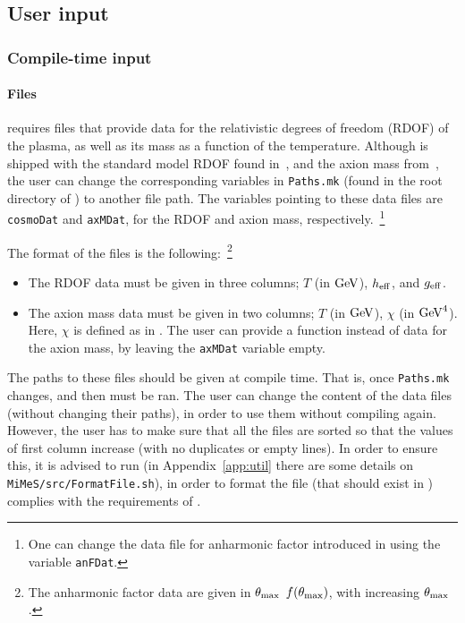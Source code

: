 \documentclass[11pt,a4paper]{article}
\begin{document}
\subsection{User input}\label{sec:input}
%
\subsubsection{Compile-time input}\label{sec:compile_time_input} 
%
\paragraph{Files} \mimes requires files that provide data for the relativistic degrees of freedom (RDOF) of the plasma, as well as its mass as a function of the temperature. Although \mimes is shipped with the standard model RDOF found in~\cite{Saikawa:2020swg}, and the axion mass from~\cite{Borsanyi:2016ksw}, the user can change the corresponding variables in {\tt Paths.mk} (found in the root directory of \mimes) to another file path. The variables pointing to these data files are {\tt cosmoDat} and {\tt axMDat}, for the RDOF and axion mass, respectively.~\footnote{One can change the data file for anharmonic factor introduced in  using the variable {\tt anFDat}.}

The format of the files is the following:~\footnote{The anharmonic factor data are given in $\theta_{\rm max}{}$ $f(\theta_{\rm max}{})$, with increasing $\theta_{\rm max}{}$.} 
%
\begin{itemize}
	\item The RDOF data must be given in three columns; $T$ (in ${\rm GeV}$), $h_{\rm eff}{}$, and $g_{\rm eff}{}$.
	\item The axion mass data must be given in two columns; $T$ (in ${\rm GeV}$), $\chi$ (in ${\rm GeV}^4$). Here, $\chi$ is defined as in . 
	The user can provide a function instead of data for the axion mass, by leaving the  {\tt axMDat} variable empty. 
\end{itemize}
%
The paths to these files should be given at compile time. That is, once {\tt Paths.mk} changes,  and then  must be ran. The user can change the content of the data files (without changing their paths), in order to use them without compiling \mimes again. However, the user has to make sure that all the files are sorted so that the values of first column increase (with no duplicates or empty lines). In order to ensure this, it is advised to run  (in Appendix~\ref{app:util} there are some details on {\tt MiMeS/src/FormatFile.sh}), in order to format the file (that should exist in ) complies with the requirements of \mimes.
\end{document}

